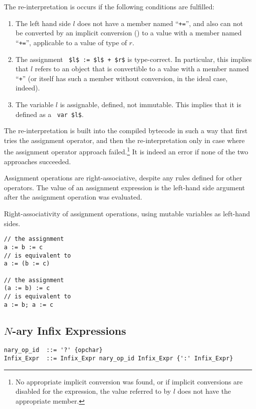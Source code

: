 The re-interpretation is occurs if the following conditions are fulfilled:
\begin{enumerate}
  \item The left hand side $l$ does not have a member named ``\lstinline!+=!'', and also can not be converted by an implicit conversion () to a value with a member named ``\lstinline!+=!'', applicable to a value of type of $r$. 
  \item The assignment ~\lstinline!$l$ := $l$ + $r$! is type-correct. In particular, this implies that $l$ refers to an object that is convertible to a value with a member named ``\lstinline!+!'' (or itself has such a member without conversion, in the ideal case, indeed). 
  \item The variable $l$ is assignable, defined, not immutable. This implies that it is defined as a ~\lstinline!var $l$!. 
\end{enumerate}

The re-interpretation is built into the compiled bytecode in such a way that first tries the assignment operator, and then the re-interpretation only in case where the assignment operator approach failed.\footnote{No appropriate implicit conversion was found, or if implicit conversions are disabled for the expression, the value referred to by $l$ does not have the appropriate member.} It is indeed an error if none of the two approaches succeeded. 

Assignment operations are right-associative, despite any rules defined for other operators. The value of an assignment expression is the left-hand side argument after the assignment operation was evaluated. 

\example Right-associativity of assignment operations, using mutable variables as left-hand sides. 
\begin{lstlisting}
// the assignment
a := b := c
// is equivalent to
a := (b := c)

// the assignment
(a := b) := c
// is equivalent to 
a := b; a := c
\end{lstlisting}




\subsection{$N$-ary Infix Expressions}
\label{sec:nary-infix-expressions}

\syntax\begin{lstlisting}
nary_op_id  ::= '?' {opchar}
Infix_Expr  ::= Infix_Expr nary_op_id Infix_Expr {':' Infix_Expr}
\end{lstlisting}

